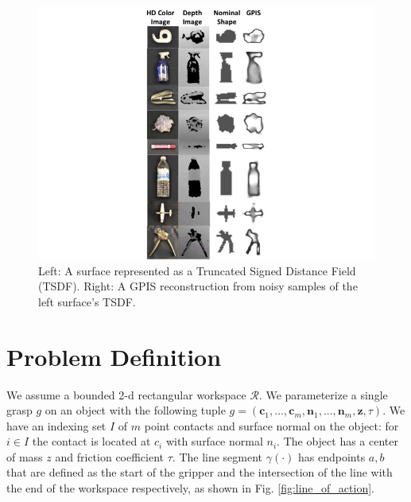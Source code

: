 \documentclass[letterpaper, 10 pt, conference]{ieeeconf}  %
\begin{document}
\begin{figure}[ht!]
\centering
\includegraphics[scale = 0.3]{figures/Slide03.jpg}
\caption{Left: A surface represented as a Truncated Signed Distance Field (TSDF).
Right: A GPIS reconstruction from noisy samples of the left surface's TSDF.}
\vspace*{-10pt}
\label{fig:GPIS_TSDF}
\end{figure}

\section{Problem Definition}


We assume a bounded 2-d rectangular workspace $\mathcal{R}$.
We parameterize a single grasp $g$ on an object with the following tuple $g = ( \textbf{c}_1,...,\textbf{c}_m,\textbf{n}_1,...,\textbf{n}_m,\textbf{z},\tau )$.
We have an indexing set $I$ of $m$ point contacts and surface normal on the object: for $i \in I$ the contact is located at $c_i$ with surface normal $n_i$.
The object has a center of mass $z$ and friction coefficient $\tau$.
The line segment $\gamma(\cdot)$ has endpoints $a,b$ that are defined as the start of the gripper and the intersection of the line with the end of the workspace respectively, as shown in Fig. 
 \ref{fig:line_of_action}.
\end{document}
